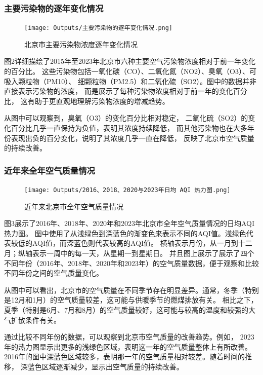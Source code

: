 \documentclass[12pt, a4paper, oneside]{ctexart}
\begin{document}
\subsubsection{主要污染物的逐年变化情况}
\begin{figure}[htb]
    \centering
    \texttt{[image: Outputs/主要污染物的逐年变化情况.png]}
    \caption{北京市主要污染物浓度逐年变化情况}
    \label{fig:pollutants_yearly}
\end{figure}
图2详细描绘了2015年至2023年北京市六种主要空气污染物浓度相对于前一年变化的百分比。
这些污染物包括一氧化碳（CO）、二氧化氮（NO2）、臭氧（O3）、可吸入颗粒物（PM10）、
细颗粒物（PM2.5）和二氧化硫（SO2）。图中的数据并非直接表示污染物的浓度，
而是展示了每种污染物浓度相对于前一年的变化百分比，
这有助于更直观地理解污染物浓度的增减趋势。

从图中可以观察到，臭氧（O3）的变化百分比相对稳定，
二氧化硫（SO2）的变化百分比几乎一直保持为负值，表明其浓度持续降低，
而其他污染物也在大多年份表现出负的百分变化，说明了其浓度几乎一直在降低，
反映了北京市空气质量的持续改善。

\subsubsection{近年来全年空气质量情况}
\begin{figure}[htb]
    \centering
    \texttt{[image: Outputs/2016、2018、2020与2023年日均 AQI 热力图.png]}
    \caption{近年来北京市全年空气质量情况}
    \label{fig:air_quality_yearly}
\end{figure}

图3展示了2016年、2018年、2020年和2023年北京市全年空气质量情况的日均AQI热力图。
图中使用了从浅绿色到深蓝色的渐变色来表示不同的AQI值。浅绿色代表较低的AQI值，而深蓝色则代表较高的AQI值。
横轴表示月份，从一月到十二月；纵轴表示一周中的每一天，从星期一到星期日。
并且图上展示了展示了四个不同年份（2016年、2018年、2020年和2023年）的空气质量数据，便于观察和比较不同年份之间的空气质量变化。

从图中可以看出，北京市的空气质量在不同季节存在明显差异。通常，冬季（特别是12月和1月）的空气质量较差，这可能与供暖季节的燃煤排放有关。
相比之下，夏季（特别是6月、7月和8月）的空气质量较好，这可能与较高的温度和较强的大气扩散条件有关。

通过比较不同年份的数据，可以观察到北京市空气质量的改善趋势。例如，
2023年的热力图显示出更多的浅绿色区域，表明这一年的空气质量整体上有所改善。
2016年的图中深蓝色区域较多，表明那一年的空气质量相对较差。随着时间的推移，
深蓝色区域逐渐减少，显示出空气质量的持续改善。
\end{document}
